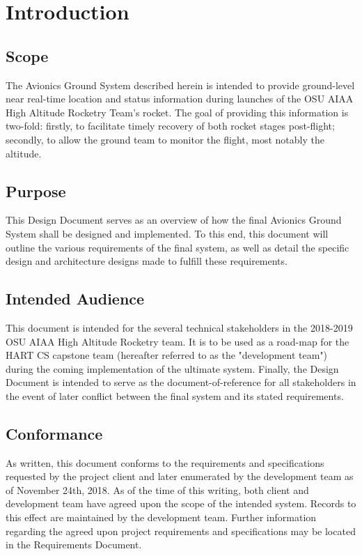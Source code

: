 \documentclass[journal,10pt,onecolumn,compsoc]{IEEEtran}
\begin{document}
\section{Introduction}

	\subsection{Scope}
		\noindent The Avionics Ground System described herein is intended to provide ground-level near real-time location and status information during launches of the OSU AIAA High Altitude Rocketry Team's rocket.
		The goal of providing this information is two-fold: firstly, to facilitate timely recovery of both rocket stages post-flight; secondly, to allow the ground team to monitor the flight, most notably the altitude.

	\subsection{Purpose}
		\noindent This Design Document serves as an overview of how the final Avionics Ground System shall be designed and implemented.
		To this end, this document will outline the various requirements of the final system, as well as detail the specific design and architecture designs made to fulfill these requirements.

	\subsection{Intended Audience}
		\noindent This document is intended for the several technical stakeholders in the 2018-2019 OSU AIAA High Altitude Rocketry team.
		It is to be used as a road-map for the HART CS capstone team (hereafter referred to as the "development team") during the coming implementation of the ultimate system.
		Finally, the Design Document is intended to serve as the document-of-reference for all stakeholders in the event of later conflict between the final system and its stated requirements.

	\subsection{Conformance}
		\noindent As written, this document conforms to the requirements and specifications requested by the project client and later enumerated by the development team as of November 24th, 2018.
		As of the time of this writing, both client and development team have agreed upon the scope of the intended system.
		Records to this effect are maintained by the development team.
		Further information regarding the agreed upon project requirements and specifications may be located in the Requirements Document.
\end{document}
